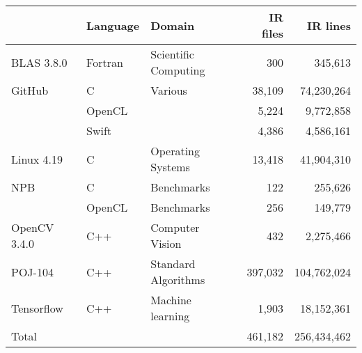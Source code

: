 \footnotesize
\begin{tabular}{L{4cm} L{1.45cm} L{2.95cm} r r}
  & Language & Domain & IR files & IR lines\\
  \toprule
  BLAS 3.8.0 & Fortran & Scientific Computing & 300 & 345,613\\
  GitHub & C & Various & 38,109 & 74,230,264 \\
   & OpenCL &  & 5,224 & 9,772,858 \\
                  & Swift & & 4,386 & 4,586,161\\
  Linux 4.19 & C & Operating Systems & 13,418 & 41,904,310 \\
  NPB~\citep{Bailey1991a} & C & Benchmarks & 122 & 255,626 \\
  \citet{Cummins2017b} & OpenCL & Benchmarks & 256 & 149,779\\
  OpenCV 3.4.0 & C++ & Computer Vision & 432 & 2,275,466 \\
  POJ-104~\citep{Mou2016} & C++ & Standard Algorithms & 397,032 & 104,762,024 \\
  Tensorflow~\citep{Abadi} & C++ & Machine learning & 1,903 & 18,152,361 \\
  \midrule
  Total & & & 461,182 & 256,434,462 \\
\end{tabular}
